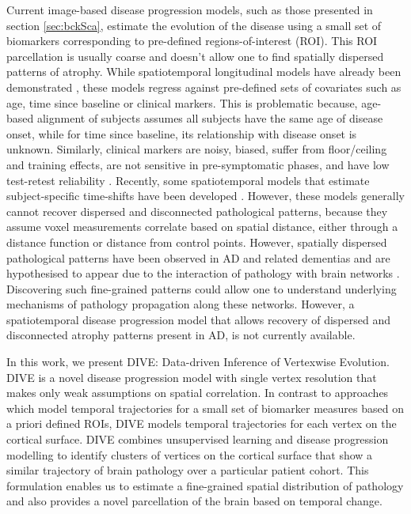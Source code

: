 Current image-based disease progression models, such as those presented in section \ref{sec:bckSca}, estimate the evolution of the disease using a small set of biomarkers corresponding to pre-defined regions-of-interest (ROI). This ROI parcellation is usually coarse and doesn't allow one to find spatially dispersed patterns of atrophy. While spatiotemporal longitudinal models have already been demonstrated \cite{derado2010modeling, hyun2016stgp, lorenzi2015efficient}, these models regress against pre-defined sets of covariates such as age, time since baseline or clinical markers. This is problematic because, age-based alignment of subjects assumes all subjects have the same age of disease onset, while for time since baseline, its relationship with disease onset is unknown. Similarly, clinical markers are noisy, biased, suffer from floor/ceiling and training effects, are not sensitive in pre-symptomatic phases, and have low test-retest reliability \cite{johnson2012brain}.  Recently, some spatiotemporal models that estimate subject-specific time-shifts have been developed \cite{bilgel2016multivariate,koval2017statistical}. However, these models generally cannot recover dispersed and disconnected pathological patterns, because they assume voxel measurements correlate based on spatial distance, either through a distance function or distance from control points. However, spatially dispersed pathological patterns have been observed in AD and related dementias and are hypothesised to appear due to the interaction of pathology with brain networks \cite{seeley2009neurodegenerative}. Discovering such fine-grained patterns could allow one to understand underlying mechanisms of pathology propagation along these networks. However, a spatiotemporal disease progression model that allows recovery of dispersed and disconnected atrophy patterns present in AD, is not currently available. 

In this work, we present DIVE: Data-driven Inference of Vertexwise Evolution. DIVE is a novel disease progression model with single vertex resolution that makes only weak assumptions on spatial correlation. In contrast to approaches which model temporal trajectories for a small set of biomarker measures based on a priori defined ROIs, DIVE models temporal trajectories for each vertex on the cortical surface. DIVE combines unsupervised learning and disease progression modelling to identify clusters of vertices on the cortical surface that show a similar trajectory of brain pathology over a particular patient cohort. This formulation enables us to estimate a fine-grained spatial distribution of pathology and also provides a novel parcellation of the brain based on temporal change. 

